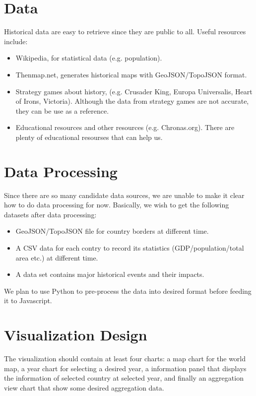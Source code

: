 \documentclass[12pt, fullpage,letterpaper]{article}
\begin{document}
\section{Data}
Historical data are easy to retrieve since they are public to all. Useful resources include:
\begin{itemize}
    \item Wikipedia, for statistical data (e.g. population).
    \item Thenmap.net, generates historical maps with GeoJSON/TopoJSON format.
    \item Strategy games about history, (e.g. Crusader King, Europa Universalis, Heart of Irons, Victoria). Although the data from strategy games are not accurate, they can be use
        as a reference.
    \item Educational resources and other resources (e.g. Chronas.org). There are plenty of educational resourses that can help us.
\end{itemize}

\section{Data Processing}
Since there are so many candidate data sources, we are unable to make it clear how to do data processing for now.
Basically, we wish to get the following datasets after data processing:
\begin{itemize}
    \item GeoJSON/TopoJSON file for country borders at different time.
    \item A CSV data for each contry to record its statistics (GDP/population/total area etc.) at different time.
    \item A data set contains major historical events and their impacts.
\end{itemize}

We plan to use Python to pre-process the data into desired format before feeding it to Javascript.

\section{Visualization Design}

The visualization should contain at least four charts: a map chart for the world map, a year chart for selecting a desired year, a information panel that displays the information
of selected country at selected year, and finally an aggregation view chart that show some desired aggregation data.
\end{document}
